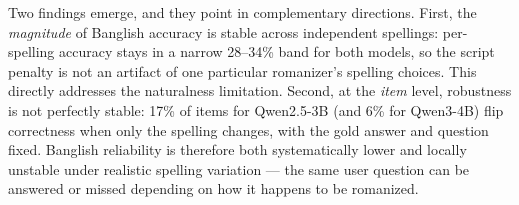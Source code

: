 Two findings emerge, and they point in complementary directions. First, the \emph{magnitude} of Banglish accuracy is stable across independent spellings: per-spelling accuracy stays in a narrow 28--34\% band for both models, so the script penalty is not an artifact of one particular romanizer's spelling choices. This directly addresses the naturalness limitation. Second, at the \emph{item} level, robustness is not perfectly stable: 17\% of items for Qwen2.5-3B (and 6\% for Qwen3-4B) flip correctness when only the spelling changes, with the gold answer and question fixed. Banglish reliability is therefore both systematically lower and locally unstable under realistic spelling variation --- the same user question can be answered or missed depending on how it happens to be romanized.

\endinput
